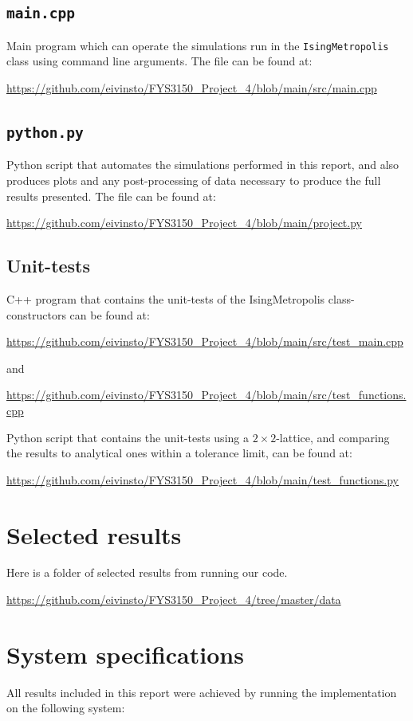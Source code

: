 \documentclass[reprint,english,notitlepage]{revtex4-1}  %
\begin{document}
\cprotect\subsection{\verb+main.cpp+} \label{A.3}

Main program which can operate the simulations run in the \verb+IsingMetropolis+ class using command line arguments. The file can be found at:

\url{https://github.com/eivinsto/FYS3150_Project_4/blob/main/src/main.cpp}

\cprotect\subsection{\verb+python.py+} \label{A.4}

Python script that automates the simulations performed in this report, and also produces plots and any post-processing of data necessary to produce the full results presented. The file can be found at:

\url{https://github.com/eivinsto/FYS3150_Project_4/blob/main/project.py}

\cprotect\subsection{Unit-tests} \label{A.5}

C++ program that contains the unit-tests of the IsingMetropolis class-constructors can be found at:

\url{https://github.com/eivinsto/FYS3150_Project_4/blob/main/src/test_main.cpp}

and

\url{https://github.com/eivinsto/FYS3150_Project_4/blob/main/src/test_functions.cpp}

Python script that contains the unit-tests using a $2 \times 2$-lattice, and comparing the results to analytical ones within a tolerance limit, can be found at:

\url{https://github.com/eivinsto/FYS3150_Project_4/blob/main/test_functions.py}


\newpage
\section{Selected results} \label{B}
Here is a folder of selected results from running our code.

\url{https://github.com/eivinsto/FYS3150_Project_4/tree/master/data}

\newpage
\section{System specifications} \label{C}
All results included in this report were achieved by running the implementation on the following system:
\end{document}

